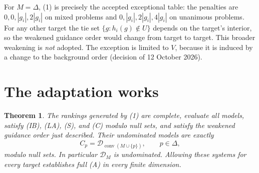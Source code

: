 \documentclass[11pt]{article}
\newtheorem{theorem}{Theorem}
\newcommand{\Dscr}{\mathcal D}
\begin{document}
For $M=\Delta$, (1) is precisely the accepted exceptional table: the
penalties are $0,0,|g_i|,2|g_i|$ on mixed problems and
$0,|g_i|,2|g_i|,4|g_i|$ on unanimous problems. For any other target the
tie set $\{g:h_i(g)\notin U\}$ depends on the target's interior, so the
weakened guidance order would change from target to target. This broader
weakening is \emph{not} adopted. The exception is limited to $V$, because
it is induced by a change to the background order (decision of
12 October 2026).

\section{The adaptation works}

\begin{theorem}
The rankings generated by (1) are complete, evaluate all models, satisfy
(IB), (LA), (S), and (C) modulo null sets, and satisfy the weakened
guidance order just described. Their undominated models are exactly
\[
 C_p=\Dscr_{\operatorname{conv}(M\cup\{p\})},\qquad p\in\Delta,
\tag{2}
\]
modulo null sets. In particular $\Dscr_M$ is undominated. Allowing these
systems for every target establishes full (A) in every finite dimension.
\end{theorem}
\end{document}

